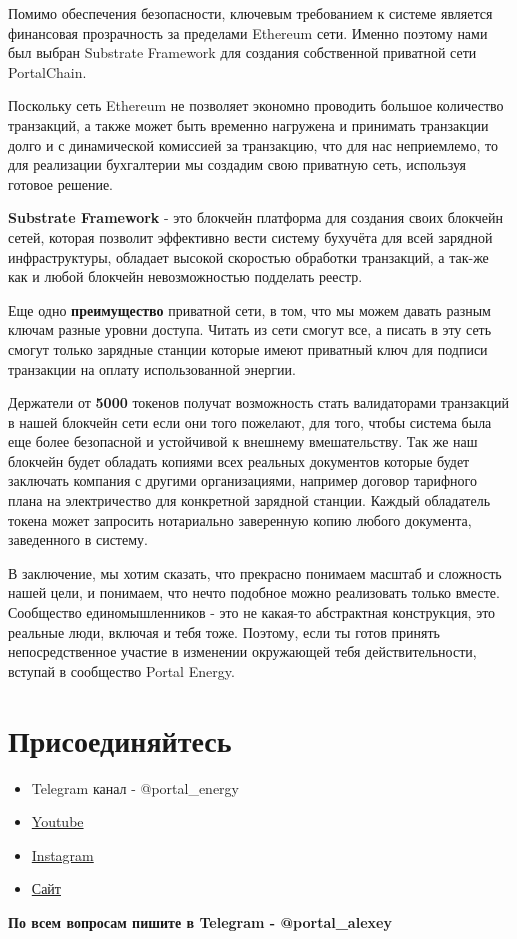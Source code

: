 \documentclass[a4paper,12pt]{report}
\begin{document}
Помимо обеспечения безопасности, ключевым требованием к системе является финансовая прозрачность за пределами Ethereum сети.
Именно поэтому нами был выбран Substrate Framework для создания собственной приватной сети PortalChain.

Поскольку сеть Ethereum не позволяет экономно проводить большое количество транзакций, а также может быть временно нагружена и принимать транзакции долго и с динамической комиссией за транзакцию, что для нас неприемлемо, то для реализации бухгалтерии мы создадим свою приватную сеть, используя готовое решение.

\textbf{Substrate Framework} - это блокчейн платформа для создания своих блокчейн сетей, которая позволит эффективно вести систему бухучёта для всей зарядной инфраструктуры, обладает высокой скоростью обработки транзакций, а так-же как и любой блокчейн невозможностью подделать реестр.

Еще одно \textbf{преимущество} приватной сети, в том, что мы можем давать разным ключам разные уровни доступа. Читать из сети смогут все, а писать в эту сеть смогут только зарядные станции которые имеют приватный ключ для подписи транзакции на оплату использованной энергии.

Держатели от \textbf{5000} токенов получат возможность стать валидаторами транзакций в нашей блокчейн сети если они того пожелают, для того, чтобы система была еще более безопасной и устойчивой к внешнему вмешательству. Так же наш блокчейн будет обладать копиями всех реальных документов которые будет заключать компания с другими организациями, например договор тарифного плана на электричество для конкретной зарядной станции.
Каждый обладатель токена может запросить нотариально заверенную копию любого документа, заведенного в систему.

В заключение, мы хотим сказать, что прекрасно понимаем масштаб и сложность нашей цели, и понимаем, что нечто подобное можно реализовать только вместе. Сообщество единомышленников - это не какая-то абстрактная конструкция, это реальные люди, включая и тебя тоже. Поэтому, если ты готов принять непосредственное участие в изменении окружающей тебя действительности, вступай в сообщество Portal Energy.

\section{Присоединяйтесь}

\begin{itemize}
	\item Telegram канал - @portal\_energy
	\item \href{https://www.youtube.com/channel/UCtPxyCkz73i78F9HChlO61w}{Youtube}
	\item \href{https://www.instagram.com/petr_roadrunner/}{Instagram}
	\item \href{https://portalenergy.tech}{Сайт}
\end{itemize}

\textbf{По всем вопросам пишите в Telegram - @portal\_alexey}
\end{document}
